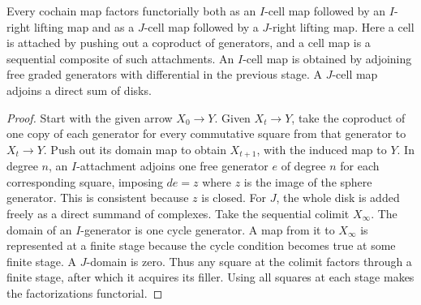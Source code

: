 \begin{lemma}\label{res:Q11}
Every cochain map factors functorially both as an \(I\)-cell
map followed by an \(I\)-right lifting map and as a \(J\)-cell
map followed by a \(J\)-right lifting map. Here a cell is
attached by pushing out a coproduct of generators, and a
cell map is a sequential composite of such attachments.
An \(I\)-cell map is obtained by adjoining free graded
generators with differential in the previous stage.
A \(J\)-cell map adjoins a direct sum of disks.
\end{lemma}
\begin{proof}
Start with the given arrow \(X_0\to Y\). Given \(X_t\to Y\),
take the coproduct of one copy of each generator for every
commutative square from that generator to \(X_t\to Y\).
Push out its domain map to obtain \(X_{t+1}\), with the
induced map to \(Y\). In degree \(n\), an \(I\)-attachment
adjoins one free generator \(e\) of degree \(n\) for each
corresponding square, imposing \(de=z\) where \(z\) is the
image of the sphere generator. This is consistent because
\(z\) is closed. For \(J\), the whole disk is added freely
as a direct summand of complexes. Take the sequential
colimit \(X_\infty\). The domain of an \(I\)-generator is
one cycle generator. A map from it to \(X_\infty\) is
represented at a finite stage because the cycle condition
becomes true at some finite stage. A \(J\)-domain is zero.
Thus any square at the colimit factors through a finite
stage, after which it acquires its filler. Using all
squares at each stage makes the factorizations functorial.
\end{proof}

